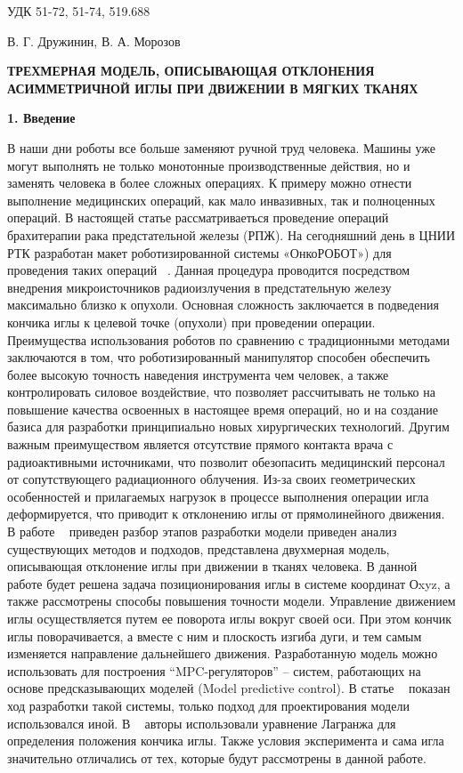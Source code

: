 \documentclass[10pt]{article}
\begin{document}
\large \noindent  УДК 51-72, 51-74, 519.688

\bigskip

 В. Г. Дружинин, В. А. Морозов
 
\begin{center}
\bf ТРЕХМЕРНАЯ МОДЕЛЬ, ОПИСЫВАЮЩАЯ ОТКЛОНЕНИЯ АСИММЕТРИЧНОЙ ИГЛЫ ПРИ ДВИЖЕНИИ В МЯГКИХ ТКАНЯХ
\end{center}

\bigskip
\textbf{1. Введение}

\bigskip
В наши дни роботы все больше заменяют ручной труд человека. Машины уже могут выполнять не только монотонные производственные действия, но и заменять человека в более сложных операциях. К примеру можно отнести выполнение медицинских операций, как мало инвазивных, так и полноценных операций.
В настоящей статье рассматриваеться проведение операций брахитерапии рака предстательной железы (РПЖ). На сегодняшний день в ЦНИИ РТК разработан макет роботизированной системы «ОнкоРОБОТ») для проведения таких операций ~\cite{one, two}. 
Данная процедура проводится посредством внедрения микроисточников радиоизлучения в предстательную железу максимально близко к опухоли. Основная сложность заключается в подведения кончика иглы к целевой точке (опухоли) при проведении операции.
Преимущества использования роботов по сравнению с традиционными методами заключаются в том, что роботизированный манипулятор способен обеспечить более высокую точность наведения инструмента чем человек, а также контролировать силовое воздействие, что позволяет рассчитывать не только на повышение качества освоенных в настоящее время операций, но и на создание базиса для разработки принципиально новых хирургических технологий. 
Другим важным преимуществом является отсутствие прямого контакта врача с радиоактивными источниками, что позволит обезопасить медицинский персонал от сопутствующего радиационного облучения.
Из-за своих геометрических особенностей и прилагаемых нагрузок в процессе выполнения операции игла деформируется, что приводит к отклонению иглы от прямолинейного движения. 
В работе ~\cite{three} приведен разбор этапов разработки модели приведен анализ существующих методов и подходов, представлена двухмерная модель, описывающая отклонение иглы при движении в тканях человека. 
В данной работе будет решена задача позиционирования иглы в системе координат Оxyz, а также рассмотрены способы повышения точности модели. 
Управление движением иглы осуществляется путем ее поворота иглы вокруг своей оси. При этом кончик иглы поворачивается, а вместе с ним и плоскость изгиба дуги, 
и тем самым изменяется направление дальнейшего движения.
Разработанную модель можно использовать для построения “MPC-регуляторов” – систем, работающих на основе предсказывающих моделей (Model predictive control).
В статье ~\cite{four} показан ход разработки такой системы, только подход для проектирования модели использовался иной. В ~\cite{four} авторы использовали уравнение Лагранжа для определения положения кончика иглы. Также условия эксперимента и сама игла значительно отличались от тех, которые будут рассмотрены в данной работе.
\end{document}
